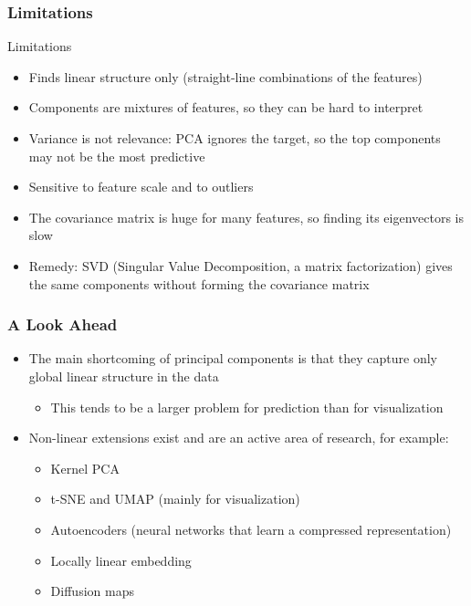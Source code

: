 \begin{frame}[fragile]
\frametitle{Limitations}
Limitations
\begin{itemize}
	\item Finds linear structure only (straight-line combinations of the features)
	\item Components are mixtures of features, so they can be hard to interpret
	\item Variance is not relevance: PCA ignores the target, so the top components may not be the most predictive
	\item Sensitive to feature scale and to outliers
	\item The covariance matrix is huge for many features, so finding its eigenvectors is slow
	\item Remedy: SVD (Singular Value Decomposition, a matrix factorization) gives the same components without forming the covariance matrix
\end{itemize}
\end{frame}



\begin{frame}[fragile] \frametitle{A Look Ahead}

\begin{itemize}
\item The main shortcoming of principal components is that they capture only global linear structure in the data
\begin{itemize}
\item This tends to be a larger problem for prediction than for visualization
\end{itemize}
\item Non-linear extensions exist and are an active area of research, for example:
\begin{itemize}
\item Kernel PCA
\item t-SNE and UMAP (mainly for visualization)
\item Autoencoders (neural networks that learn a compressed representation)
\item Locally linear embedding
\item Diffusion maps
\end{itemize}
\end{itemize}

\end{frame}

